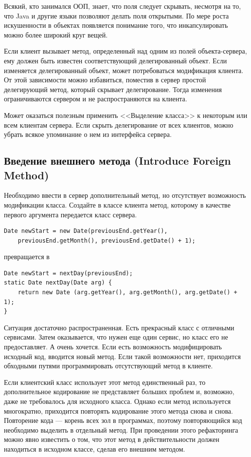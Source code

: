\documentclass{../../text-style}
\begin{document}
Всякий, кто занимался ООП, знает, что поля следует скрывать, несмотря на то, что Java и другие языки позволяют делать поля открытыми. По мере роста искушенности в объектах появляется понимание того, что инкапсулировать можно более широкий круг вещей.

Если клиент вызывает метод, определенный над одним из полей объекта-сервера, ему должен быть известен соответствующий делегированный объект. Если изменяется делегированный объект, может потребоваться модификация клиента. От этой зависимости можно избавиться, поместив в сервер простой делегирующий метод, который скрывает делегирование. Тогда изменения ограничиваются сервером и не распространяются на клиента.

Может оказаться полезным применить <<Выделение класса>> к некоторым или всем клиентам сервера. Если скрыть делегирование от всех клиентов, можно убрать всякое упоминание о нем из интерфейса сервера.

\subsection{Введение внешнего метода (Introduce Foreign Method)}

Необходимо ввести в сервер дополнительный метод, но отсутствует возможность модификации класса. Создайте в классе клиента метод, которому в качестве первого аргумента передается класс сервера.

\begin{verbatim}
Date newStart = new Date(previousEnd.getYear(),
    previousEnd.getMonth(), previousEnd.getDate() + 1);
\end{verbatim}

превращается в 

\begin{verbatim}
Date newStart = nextDay(previousEnd);
static Date nextDay(Date arg) {
    return new Date (arg.getYear(), arg.getMonth(), arg.getDate() + 1);
}
\end{verbatim}

Ситуация достаточно распространенная. Есть прекрасный класс с отличными сервисами. Затем оказывается, что нужен еще один сервис, но класс его не предоставляет. А очень хочется. Если есть возможность модифицировать исходный код, вводится новый метод. Если такой возможности нет, приходится обходными путями программировать отсутствующий метод в клиенте.

Если клиентский класс использует этот метод единственный раз, то дополнительное кодирование не представляет больших проблем и, возможно, даже не требовалось для исходного класса. Однако если метод используется многократно, приходится повторять кодирование этого метода снова и снова. Повторение кода --- корень всех зол в программах, поэтому повторяющийся код необходимо выделить в отдельный метод. При проведении этого рефакторинга можно явно известить о том, что этот метод в действительности должен находиться в исходном классе, сделав его внешним методом.
\end{document}
